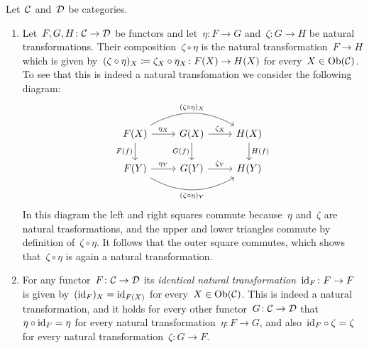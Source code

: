 \begin{remark}
  Let~$\mathcal{C}$ and~$\mathcal{D}$ be categories.
  \begin{enumerate}
    \item
      Let~$F, G, H \colon \mathcal{C} \to \mathcal{D}$ be functors and let~$\eta \colon F \to G$ and~$\zeta \colon G \to H$ be natural transformations.
      Their composition~$\zeta \circ \eta$ is the natural transformation~$F \to H$ which is given by~$(\zeta \circ \eta)_X \coloneqq \zeta_X \circ \eta_X \colon F(X) \to H(X)$ for every~$X \in \operatorname{Ob}(\mathcal{C})$.
      To see that this is indeed a natural transfomation we consider the following diagram:
      \[
        \begin{tikzcd}
            F(X)
            \arrow[bend left]{rr}[above]{(\zeta \circ \eta)_X}
            \arrow{r}[above]{\eta_X}
            \arrow{d}[left]{F(f)}
          & G(X)
            \arrow{r}[above]{\zeta_X}
            \arrow{d}[left]{G(f)}
          & H(X)
            \arrow{d}[right]{H(f)}
          \\
            F(Y)
            \arrow{r}[above]{\eta_Y}
            \arrow[bend right]{rr}[below]{(\zeta \circ \eta)_Y}
          & G(Y)
            \arrow{r}[above]{\zeta_Y}
          & H(Y)
        \end{tikzcd}
      \]
      In this diagram the left and right squares commute because~$\eta$ and~$\zeta$ are natural trasformations, and the upper and lower triangles commute by definition of~$\zeta \circ \eta$.
      It follows that the outer square commutes, which shows that~$\zeta \circ \eta$ is again a natural transformation.
    \item
      For any functor~$F \colon \mathcal{C} \to \mathcal{D}$ its \emph{identical natural transformation}~$\operatorname{id}_F \colon F \to F$ is given by~$(\operatorname{id}_F)_X = \operatorname{id}_{F(X)}$ for every~$X \in \operatorname{Ob}(\mathcal{C})$.
      This is indeed a natural transformation, and it holds for every other functor~$G \colon \mathcal{C} \to \mathcal{D}$ that~$\eta \circ {\operatorname{id}_F} = \eta$ for every natural transformation~$\eta \colon F \to G$, and also~${\operatorname{id}_F} \circ \zeta = \zeta$ for every natural transformation~$\zeta \colon G \to F$.
  \end{enumerate}
\end{remark}


